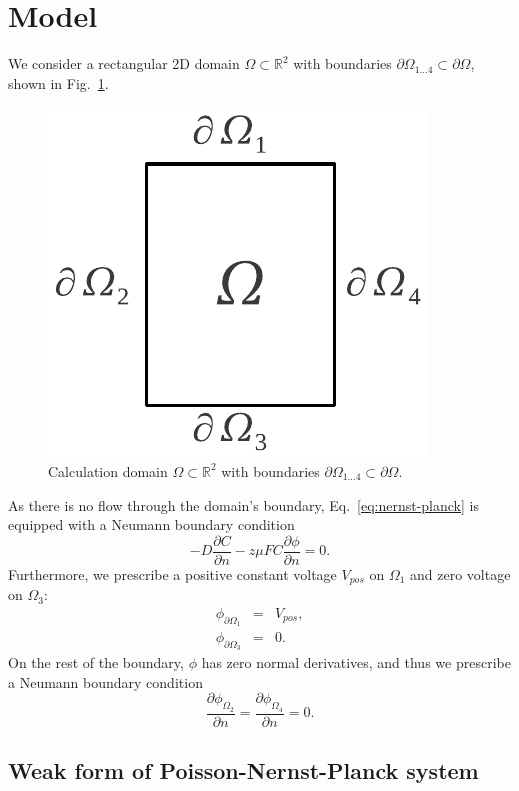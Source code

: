 \section{Model}\label{sec:model}

We consider a rectangular 2D domain $\Omega\subset\mathbb{R}^2$ with boundaries 
$\partial\Omega_{1\ldots 4}\subset\partial\Omega$, shown in Fig.~\ref{fig:domain}.

\begin{figure}[!ht]
  \begin{centering}
  \includegraphics[width=0.2\columnwidth]{domain}
  \caption{\label{fig:domain} Calculation domain $\Omega\subset\mathbb{R}^2$
  	with boundaries $\partial\Omega_{1\ldots 4}\subset\partial\Omega$.}
  \end{centering}
\end{figure}

As there is no flow through the domain's boundary, Eq.~\eqref{eq:nernst-planck}
is equipped with a Neumann boundary condition 
\begin{equation}
  -D \frac{\partial C}{\partial n} - z \mu F C \frac{\partial \phi} {\partial n} = 0.
  \label{eq:nernst-planck-boundary}
\end{equation}
Furthermore, we prescribe a positive constant voltage $V_{pos}$ 
on $\Omega_1$ and zero voltage on $\Omega_3$:
\begin{eqnarray}
  \phi_{\partial\Omega_1}&=&V_{pos},\\
  \phi_{\partial\Omega_3}&=&0.
  \label{eq:dirichlet}
\end{eqnarray}
On the rest of the boundary, $\phi$ has zero normal derivatives, and thus we prescribe 
a Neumann boundary condition
\begin{equation}
  \frac{\partial \phi_{\Omega_2}}{\partial n}=\frac{\partial \phi_{\Omega_4}}{\partial n}=0.
\end{equation}


\subsection{Weak form of Poisson-Nernst-Planck system}

